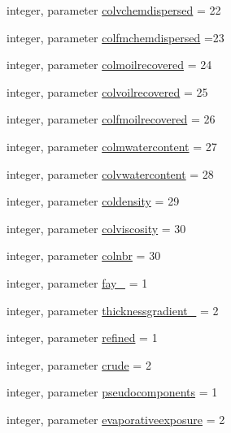 \begin{DoxyCompactItemize}
integer, parameter \mbox{\hyperlink{namespacemoduleoil__0d_acee45b3e3f1d68d284e4051d62c83c4f}{colvchemdispersed}} = 22
\item 
integer, parameter \mbox{\hyperlink{namespacemoduleoil__0d_aa8c7e330749c731e093773786b7e3021}{colfmchemdispersed}} =23
\item 
integer, parameter \mbox{\hyperlink{namespacemoduleoil__0d_a0b2dac08c7702f692a25ec3f55eb9963}{colmoilrecovered}} = 24
\item 
integer, parameter \mbox{\hyperlink{namespacemoduleoil__0d_a0558e019cc320bee4dcc2a00dc0832a6}{colvoilrecovered}} = 25
\item 
integer, parameter \mbox{\hyperlink{namespacemoduleoil__0d_aa759460c1d7d6e404f428567a47a779c}{colfmoilrecovered}} = 26
\item 
integer, parameter \mbox{\hyperlink{namespacemoduleoil__0d_ad2836f14c2c7a38c29d1e0c90cd03bc8}{colmwatercontent}} = 27
\item 
integer, parameter \mbox{\hyperlink{namespacemoduleoil__0d_ae06b335e38dbdb67bb4d26f499db8116}{colvwatercontent}} = 28
\item 
integer, parameter \mbox{\hyperlink{namespacemoduleoil__0d_acb0f41d57655acbdec9be151e087c898}{coldensity}} = 29
\item 
integer, parameter \mbox{\hyperlink{namespacemoduleoil__0d_aa9445f51edab9768043babba745ed59e}{colviscosity}} = 30
\item 
integer, parameter \mbox{\hyperlink{namespacemoduleoil__0d_a3994e483c147f44631095ac0e23a0538}{colnbr}} = 30
\item 
integer, parameter \mbox{\hyperlink{namespacemoduleoil__0d_a8853fb03d6698ffe8b3fe2a015eb02fa}{fay\+\_\+}} = 1
\item 
integer, parameter \mbox{\hyperlink{namespacemoduleoil__0d_a3e2005b8a7170d66bb4597b14d5fb82b}{thicknessgradient\+\_\+}} = 2
\item 
integer, parameter \mbox{\hyperlink{namespacemoduleoil__0d_a0765c6e0740a991efbe77e297cba903d}{refined}} = 1
\item 
integer, parameter \mbox{\hyperlink{namespacemoduleoil__0d_a5c5771f292167803f757e7551b612ba6}{crude}} = 2
\item 
integer, parameter \mbox{\hyperlink{namespacemoduleoil__0d_aceadbff511a06679ac44a229ec601150}{pseudocomponents}} = 1
\item 
integer, parameter \mbox{\hyperlink{namespacemoduleoil__0d_ad902a9dc6f2fa7214ed579187778d11f}{evaporativeexposure}} = 2
\item 

\end{DoxyCompactItemize}
